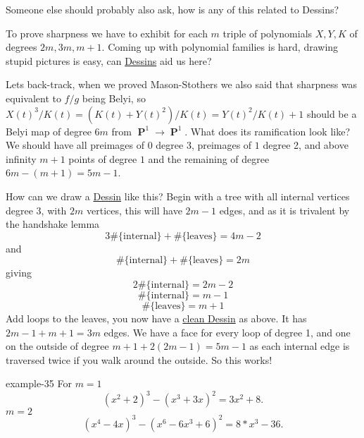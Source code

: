 \documentclass[10pt,]{book}
\numberwithin{equation}{section}
\DeclareMathOperator{\PP}{\mathbf{P}}
\begin{document}
Someone else should probably also ask, how is any of this related to Dessins?%
\par
\hypertarget{p-726}{}%
To prove sharpness we have to exhibit for each \(m\) triple of polynomials \(X,Y,K\) of degrees \(2m,3m,m+1\). Coming up with polynomial families is hard, drawing stupid pictures is easy, can \hyperref[def-dessin-denfant]{Dessins} aid us here?%
\par
\hypertarget{p-727}{}%
Lets back-track, when we proved Mason-Stothers we also said that sharpness was equivalent to \(f/g\) being Belyi, so \(X(t)^3/K(t) = (K(t) + Y(t)^2) / K(t) = Y(t)^2/K(t) + 1\) should be a Belyi map of degree \(6m\) from \(\PP^1\to \PP^1\). What does its ramification look like? We should have all preimages of \(0\) degree 3, preimages of \(1\) degree 2, and above infinity \(m + 1\) points of degree \(1\) and the remaining of degree \(6m - (m + 1) = 5m - 1\).%
\par
\hypertarget{p-728}{}%
How can we draw a \hyperref[def-dessin-denfant]{Dessin} like this? Begin with a tree with all internal vertices degree 3, with \(2m\) vertices, this will have \(2m - 1\) edges, and as it is trivalent by the handshake lemma%
\begin{equation*}
3 \#\{\text{internal}\} + \#\{\text{leaves}\} =  4m - 2
\end{equation*}
and%
\begin{equation*}
\#\{\text{internal}\} + \#\{\text{leaves}\} =  2m
\end{equation*}
giving%
\begin{equation*}
2\#\{\text{internal}\} =  2m - 2
\end{equation*}
%
\begin{equation*}
\#\{\text{internal}\} =  m - 1
\end{equation*}
%
\begin{equation*}
\#\{\text{leaves}\} =  m + 1
\end{equation*}
Add loops to the leaves, you now have a \hyperref[def-clean-dessin]{clean Dessin} as above. It has \(2m- 1 + m + 1 = 3m\) edges. We have a face for every loop of degree 1, and one on the outside of degree \(m+ 1 +2(2m-1)  = 5m - 1\) as each internal edge is traversed twice if you walk around the outside. So this works!%
\begin{example}{}{example-35}%
\hypertarget{p-729}{}%
For \(m= 1\)%
\begin{equation*}
(x^2 + 2)^3 - (x^3 + 3x)^2 = 3x^2 + 8\text{.}
\end{equation*}
\(m= 2\)%
\begin{equation*}
(x^4 - 4x)^3 - (x^6 -6x^3+6)^2  = 8*x^3 - 36\text{.}
\end{equation*}
%
\end{example}
\end{document}
